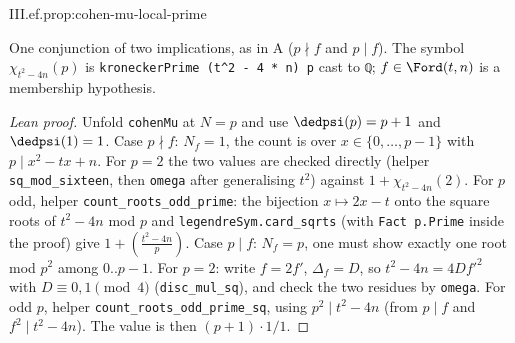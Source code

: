 \begin{proposition}
\end{proposition}
\begin{tfformal}{III.ef.prop:cohen-mu-local-prime}
\begin{tffidelity}
One conjunction of two implications, as in A ($p\nmid f$ and $p\mid f$). The symbol $\chi_{t^2-4n}(p)$ is \texttt{kroneckerPrime (t\^{}2 - 4 * n) p} cast to \texttt{ℚ}; $f\in\Ford(t,n)$ is a membership hypothesis.
\end{tffidelity}
\end{tfformal}
\begin{proof}[Lean proof]
Unfold \texttt{cohenMu} at $N=p$ and use $\dedpsi(p)=p+1$ and $\dedpsi(1)=1$. Case $p\nmid f$: $N_f=1$, the count is over $x\in\{0,\dots,p-1\}$ with $p\mid x^2-tx+n$. For $p=2$ the two values are checked directly (helper \texttt{sq\_mod\_sixteen}, then \texttt{omega} after generalising $t^2$) against $1+\chi_{t^2-4n}(2)$. For $p$ odd, helper \texttt{count\_roots\_odd\_prime}: the bijection $x\mapsto2x-t$ onto the square roots of $t^2-4n$ mod $p$ and \texttt{legendreSym.card\_sqrts} (with \texttt{Fact p.Prime} inside the proof) give $1+\left(\frac{t^2-4n}{p}\right)$. Case $p\mid f$: $N_f=p$, one must show exactly one root mod $p^2$ among $0..p-1$. For $p=2$: write $f=2f'$, $\Delta_f=D$, so $t^2-4n=4Df'^2$ with $D\equiv0,1\pmod4$ (\texttt{disc\_mul\_sq}), and check the two residues by \texttt{omega}. For odd $p$, helper \texttt{count\_roots\_odd\_prime\_sq}, using $p^2\mid t^2-4n$ (from $p\mid f$ and $f^2\mid t^2-4n$). The value is then $(p+1)\cdot1/1$.
\end{proof}

